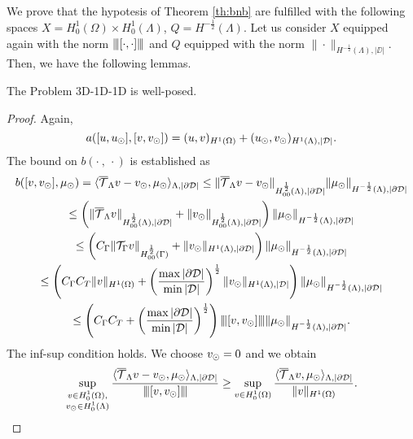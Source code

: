 We prove that the hypotesis of  Theorem \ref{th:bnb} are fulfilled with the following spaces $X=H^1_0(\Omega) \times H^1_0(\Lambda)$, $Q=H^{-\frac 12}(\Lambda)$.
Let us consider $X$ equipped again with the norm ${\left\vert\kern-0.25ex\left\vert\kern-0.25ex\left\vert [\cdot,\cdot ] \right\vert\kern-0.25ex\right\vert\kern-0.25ex\right\vert}$ and  
$Q$ equipped with the norm $\|\cdot \|_{H^{-\frac 12}(\Lambda),|\DD|}$.
Then, we have the following lemmas.
\begin{lemma}
The Problem 3D-1D-1D is well-posed.
\end{lemma}
\begin{proof}
Again, 
\begin{equation*}
a([u, u_{\odot}], [v, v_{\odot}]) = (u,v)_{H^1(\Omega)} + (u_{\odot}, v_{\odot})_{H^1(\Lambda), |\mathcal{D}|}.
\end{equation*}
The bound on $b(\cdot \ , \ \cdot)$ is established as
\begin{multline*}
b([v, v_{\odot}], \mu_{\odot})=  \langle  {\overline{\mathcal{T}}_\Lambda} v - v_{\odot}, \mu_{\odot} \rangle_{\Lambda, |\partial\mathcal{D}|} 
\leq \|{\overline{\mathcal{T}}_\Lambda} v - v_{\odot}\|_{H^{\frac 12 }_{00}(\Lambda), |\partial\mathcal{D}|}\|\mu_{\odot}\|_{H^{-\frac 12}(\Lambda),|\partial\mathcal{D}|}\\
\leq \left(\|{\overline{\mathcal{T}}_\Lambda} v\|_{H^{\frac 12 }_{00}(\Lambda), |\partial\mathcal{D}|}+\|v_{\odot}\|_{H^{\frac 12 }_{00}(\Lambda), |\partial\mathcal{D}|}\right)\|\mu_{\odot}\|_{H^{-\frac 12}(\Lambda),|\partial\mathcal{D}|}\\
\leq \left(C_\Gamma \|{\mathcal{T}_\Gamma} v\|_{H^{\frac 12 }_{00}(\Gamma)}+ \|v_{\odot}\|_{H^1(\Lambda), |\partial\mathcal{D}|}\right)\|\mu_{\odot}\|_{H^{-\frac 12}(\Lambda),|\partial\mathcal{D}|} \\
\leq \left(C_\Gamma C_T\|v\|_{H^1(\Omega)}+ \left(\frac{\max |\partial\mathcal{D}|}{\min |\mathcal{D}|}\right)^{\frac 12} \|v_{\odot}\|_{H^1(\Lambda), |\mathcal{D}|}\right) \|\mu_{\odot}\|_{H^{-\frac 12}(\Lambda),|\partial\mathcal{D}|} \\
\leq  \left( C_\Gamma C_T + \left(\frac{\max |\partial\mathcal{D}|}{\min |\mathcal{D}|}\right)^{\frac 12} \right) {\left\vert\kern-0.25ex\left\vert\kern-0.25ex\left\vert [v,v_{\odot}] \right\vert\kern-0.25ex\right\vert\kern-0.25ex\right\vert}\|\mu_{\odot}\|_{H^{-\frac 12}(\Lambda),|\partial\mathcal{D}|}.
\end{multline*} 
The inf-sup condition holds. 
We choose $v_{\odot}=0$ and we obtain
\begin{equation*}
\sup _{\substack{v\in H^1_0(\Omega),\\ v_{\odot} \in H^1_0(\Lambda)}} \frac{ \langle {\overline{\mathcal{T}}_\Lambda} v - v_{\odot}, \mu_{\odot} \rangle_{\Lambda,|\partial\mathcal{D}|}}{{\left\vert\kern-0.25ex\left\vert\kern-0.25ex\left\vert [v,v_{\odot}] \right\vert\kern-0.25ex\right\vert\kern-0.25ex\right\vert}}
\geq \sup _{v\in H^1_0(\Omega)} \frac{ \langle {\overline{\mathcal{T}}_\Lambda} v, \mu_{\odot} \rangle_{\Lambda,|\partial\mathcal{D}|}}{\|v\|_{H^1(\Omega)}}. 
\end{equation*}


\end{proof}
